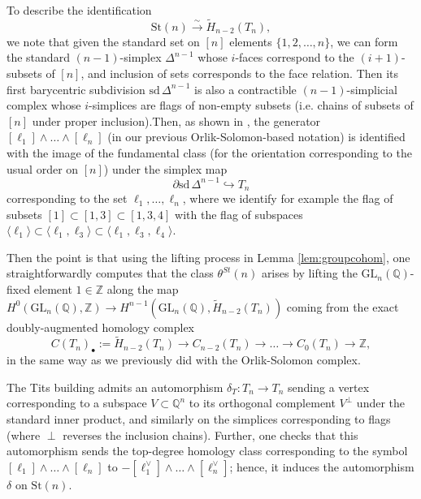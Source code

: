 \documentclass[10pt]{amsart}
\theoremstyle{definition}
\newcommand{\Z}{\mathbb{Z}}
\newcommand{\Q}{\mathbb{Q}}
\newcommand{\St}{\mathrm{St}}
\newcommand{\GL}{\mathrm{GL}}
\numberwithin{equation}{section}
\begin{document}
To describe the identification
\[ \St(n) \xrightarrow{\sim} \widetilde{H}_{n-2}(T_n),\]
we note that given the standard set on $[n]$ elements $\{1,2,\ldots, n\}$, we can form the standard $(n-1)$-simplex $\Delta^{n-1}$ whose $i$-faces correspond to the $(i+1)$-subsets of $[n]$, and inclusion of sets corresponds to the face relation. Then its first barycentric subdivision $\mathrm{sd}\,\Delta^{n-1}$ is also a contractible $(n-1)$-simplicial complex whose $i$-simplices are flags of non-empty subsets (i.e. chains of subsets of $[n]$ under proper inclusion).Then, as shown in \cite{AR}, the generator $[\ell_1]\wedge \ldots \wedge [\ell_n]$ (in our previous Orlik-Solomon-based notation) is identified with the image of the fundamental class (for the orientation corresponding to the usual order on $[n]$) under the simplex map
\begin{equation} \label{eq:simplexmap}
 \partial \mathrm{sd}\,\Delta^{n-1} \hookrightarrow T_n
\end{equation}
corresponding to the set $\ell_1,\ldots, \ell_n$, where we identify for example the flag of subsets $[1] \subset [1,3] \subset [1,3,4]$ with the flag of subspaces $\langle \ell_1\rangle \subset \langle \ell_1, \ell_3\rangle \subset \langle \ell_1, \ell_3, \ell_4 \rangle$.

Then the point is that using the lifting process in Lemma \ref{lem:groupcohom}, one straightforwardly computes that the class $\theta^{St}(n)$ arises by lifting the $\GL_n(\Q)$-fixed element $1\in \Z$ along the map $H^0(\GL_n(\Q),\Z)\to H^{n-1}(\GL_n(\Q), \widetilde{H}_{n-2}(T_n))$ coming from the exact doubly-augmented homology complex
\begin{equation} \label{eq:augtits}
C(T_n)_\bullet:=\widetilde{H}_{n-2}(T_n)\to C_{n-2}(T_n)\to \ldots \to C_{0}(T_n) \to \Z,
\end{equation}
in the same way as we previously did with the Orlik-Solomon complex. 

The Tits building admits an automorphism $\delta_T:T_n\to T_n$ sending a vertex corresponding to a subspace $V\subset \Q^n$ to its orthogonal complement $V^\perp$ under the standard inner product, and similarly on the simplices corresponding to flags (where $\perp$ reverses the inclusion chains). Further, one checks that this automorphism sends the top-degree homology class corresponding to the symbol $[\ell_1]\wedge \ldots \wedge [\ell_n]$ to $- [\ell_1^\vee] \wedge \ldots \wedge [\ell_n^\vee]$; hence, it induces the automorphism $\delta$ on $\St(n)$.
\end{document}
